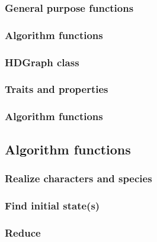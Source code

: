 \subsubsection*{General purpose functions}

\subsubsection*{Algorithm functions}

\subsubsection{HDGraph class}\label{section:hdgraph-class}

\subsubsection*{Traits and properties}

\subsubsection*{Algorithm functions}

\subsection{Algorithm functions}\label{section:algorithm-functions}

\subsubsection{Realize characters and species}\label{section:realize}

\subsubsection{Find initial state(s)}\label{section:initial-state}

\subsubsection{Reduce}\label{section:reduce}
